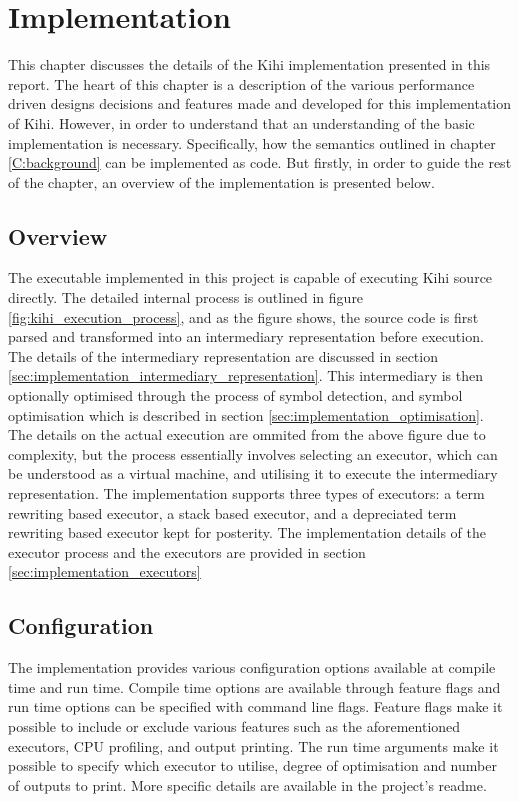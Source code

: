 \chapter{Implementation} \label{C:implementation} 
This chapter discusses the details of the Kihi implementation presented in this report. The heart of this chapter is a description of the various performance driven designs decisions and features made and developed for this implementation of Kihi. However, in order to understand that an understanding of the basic implementation is necessary. Specifically, how the semantics outlined in chapter \ref{C:background} can be implemented as code. But firstly, in order to guide the rest of the chapter, an overview of the implementation is presented below.

\section{Overview}


The executable implemented in this project is capable of executing Kihi source directly. The detailed internal process is outlined in figure \ref{fig:kihi_execution_process}, and as the figure shows, the source code is first parsed and transformed into an intermediary representation before execution. The details of the intermediary representation are discussed in section \ref{sec:implementation_intermediary_representation}. This intermediary is then optionally optimised through the process of symbol detection, and symbol optimisation which is described in section \ref{sec:implementation_optimisation}. The details on the actual execution are ommited from the above figure due to complexity, but the process essentially involves selecting an executor, which can be understood as a virtual machine, and utilising it to execute the intermediary representation. The implementation supports three types of executors: a term rewriting based executor, a stack based executor, and a depreciated term rewriting based executor kept for posterity. The implementation details of the executor process and the executors are provided in section \ref{sec:implementation_executors}


\section{Configuration}
The implementation provides various configuration options available at compile time and run time. Compile time options are available through feature flags and run time options can be specified with command line flags. Feature flags make it possible to include or exclude various features such as the aforementioned executors, CPU profiling, and output printing. The run time arguments make it possible to specify which executor to utilise, degree of optimisation and number of outputs to print. More specific details are available in the project's readme.


